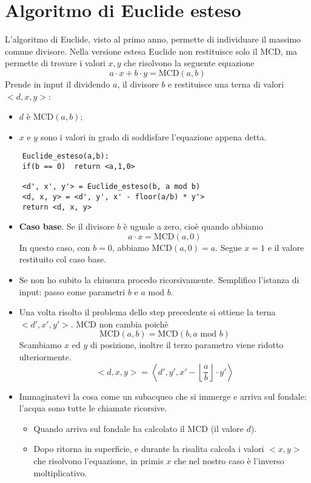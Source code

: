 \section{Algoritmo di Euclide esteso} 
L'algoritmo di Euclide, visto al primo anno, permette di individuare il massimo comune divisore. Nella versione estesa Euclide non restituisce solo il MCD, ma permette di trovare i valori $x,y$ che risolvono la seguente equazione
$$a \cdot x + b \cdot y = \text{MCD}(a,b)$$
Prende in input il dividendo $a$, il divisore $b$ e restituisce una terna di valori $<d,x,y>$:
\begin{itemize}
	\item $d$ è $\text{MCD}(a,b)$;
	\item $x$ e $y$ sono i valori in grado di soddisfare l'equazione appena detta.
\end{itemize}
\begin{verbatim}
	Euclide_esteso(a,b):
	if(b == 0) 	return <a,1,0> 
	
	<d', x', y'> = Euclide_esteso(b, a mod b)
	<d, x, y> = <d', y', x' - floor(a/b) * y'>
	return <d, x, y>
\end{verbatim}
\begin{itemize}
	\item \textbf{Caso base}. Se il divisore $b$ è uguale a zero, cioè quando abbiamo
	$$a\cdot x = \text{MCD}(a,0)$$
	In questo caso, con $b=0$, abbiamo MCD$(a,0)=a$. Segue $x=1$ e il valore restituito col caso base.
	\item Se non ho subito la chiusura procedo ricorsivamente. Semplifico l'istanza di input: passo come parametri $b$ e $a \text{ mod } b$.
	\item Una volta risolto il problema dello step precedente si ottiene la terna $<d',x',y'>$. MCD non cambia poichè
	$$\text{MCD}(a,b)=\text{MCD}(b, a \text{ mod } b)$$
	Scambiamo $x$ ed $y$ di posizione, inoltre il terzo parametro viene ridotto ulteriormente.
	$$<d, x, y>=\left<d',y', x'-\left\lfloor \frac{a}{b}\right\rfloor \cdot y'\right>$$
	\item Immaginatevi la cosa come un subacqueo che si immerge e arriva sul fondale: l'acqua sono tutte le chiamate ricorsive. 
	\begin{itemize}
		\item Quando arriva sul fondale ha calcolato il MCD (il valore $d$). 
		\item Dopo ritorna in superficie, e durante la risalita calcola i valori $<x,y>$ che risolvono l'equazione, in primis $x$ che nel nostro caso è l'inverso moltiplicativo.
	\end{itemize}
\end{itemize}
